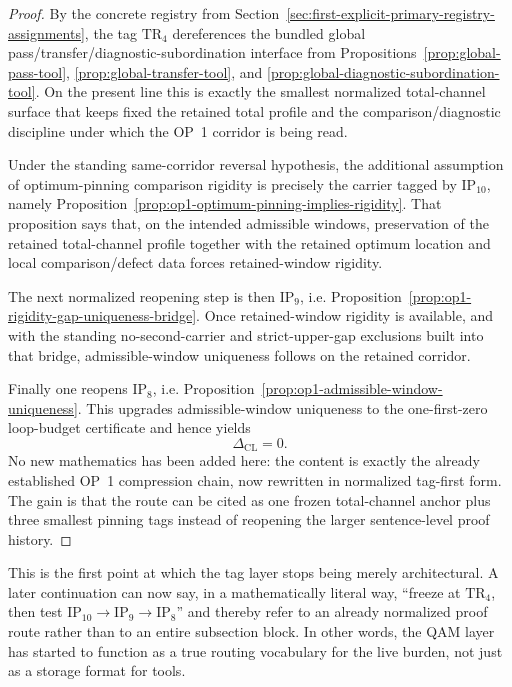 \begin{proof}
By the concrete registry from Section~\ref{sec:first-explicit-primary-registry-assignments}, the tag \(\mathrm{TR}_4\) dereferences the bundled global pass/transfer/diagnostic-subordination interface from Propositions~\ref{prop:global-pass-tool}, \ref{prop:global-transfer-tool}, and \ref{prop:global-diagnostic-subordination-tool}. On the present line this is exactly the smallest normalized total-channel surface that keeps fixed the retained total profile and the comparison/diagnostic discipline under which the OP~1 corridor is being read.

Under the standing same-corridor reversal hypothesis, the additional assumption of optimum-pinning comparison rigidity is precisely the carrier tagged by \(\mathrm{IP}_{10}\), namely Proposition~\ref{prop:op1-optimum-pinning-implies-rigidity}. That proposition says that, on the intended admissible windows, preservation of the retained total-channel profile together with the retained optimum location and local comparison/defect data forces retained-window rigidity.

The next normalized reopening step is then \(\mathrm{IP}_9\), i.e. Proposition~\ref{prop:op1-rigidity-gap-uniqueness-bridge}. Once retained-window rigidity is available, and with the standing no-second-carrier and strict-upper-gap exclusions built into that bridge, admissible-window uniqueness follows on the retained corridor.

Finally one reopens \(\mathrm{IP}_8\), i.e. Proposition~\ref{prop:op1-admissible-window-uniqueness}. This upgrades admissible-window uniqueness to the one-first-zero loop-budget certificate and hence yields
\[
 \Delta_{\mathrm{CL}} = 0.
\]
No new mathematics has been added here: the content is exactly the already established OP~1 compression chain, now rewritten in normalized tag-first form. The gain is that the route can be cited as one frozen total-channel anchor plus three smallest pinning tags instead of reopening the larger sentence-level proof history.
\end{proof}

\begin{remark}
\label{rem:what-the-first-practical-tag-rewrite-buys}
This is the first point at which the tag layer stops being merely architectural. A later continuation can now say, in a mathematically literal way, ``freeze at \(\mathrm{TR}_4\), then test \(\mathrm{IP}_{10}\to\mathrm{IP}_9\to\mathrm{IP}_8\)'' and thereby refer to an already normalized proof route rather than to an entire subsection block. In other words, the QAM layer has started to function as a true routing vocabulary for the live burden, not just as a storage format for tools.
\end{remark}


